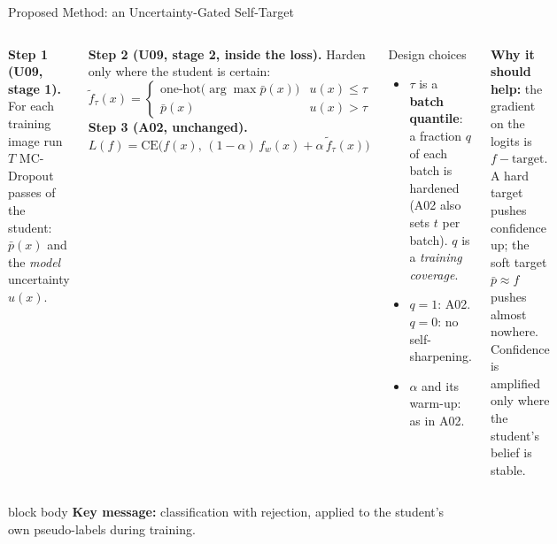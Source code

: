 \documentclass[aspectratio=169,11pt,professionalfonts]{beamer}
\newcommand{\keymsg}[1]{%
  \begin{beamercolorbox}[wd=\linewidth,rounded=true,sep=0.6em]{block body}
  \textbf{Key message:} #1
  \end{beamercolorbox}
}
\newcommand{\CE}{\mathrm{CE}}
\newcommand{\fw}{f_w}
\newcommand{\ftil}{\tilde f_\tau}
\newcommand{\pbar}{\bar p}
\begin{document}
\begin{frame}[t]{Proposed Method: an Uncertainty-Gated Self-Target}
\begin{columns}[T,totalwidth=\textwidth]
\small
\textbf{Step 1 (U09, stage 1).} For each training image run $T$ MC-Dropout passes of the student:
$\pbar(x)$ and the \emph{model} uncertainty $u(x)$.

\vspace{0.4em}
\textbf{Step 2 (U09, stage 2, inside the loss).} Harden only where the student is certain:
\[
\ftil(x)=
\begin{cases}
\text{one-hot}\big(\arg\max \pbar(x)\big) & u(x)\le\tau\\[0.2em]
\pbar(x) & u(x)>\tau
\end{cases}
\]
\textbf{Step 3 (A02, unchanged).}
\[
L(f)=\CE\!\big(f(x),\,(1-\alpha)\,\fw(x)+\alpha\,\ftil(x)\big)
\]
\begin{block}{Design choices}
\footnotesize
\begin{itemize}
  \item $\tau$ is a \textbf{batch quantile}: a fraction $q$ of each batch is hardened (A02 also sets $t$ per
  batch). $q$ is a \emph{training coverage}.
  \item $q=1$: A02. \quad $q=0$: no self-sharpening.
  \item $\alpha$ and its warm-up: as in A02.
\end{itemize}
\end{block}
\footnotesize
\textbf{Why it should help:} the gradient on the logits is $f-\text{target}$. A hard target pushes
confidence up; the soft target $\pbar\approx f$ pushes almost nowhere. Confidence is amplified only where
the student's belief is stable.
\end{columns}
\vspace{0.3em}
\keymsg{classification with rejection, applied to the student's own pseudo-labels during training.}
\end{frame}
\end{document}
